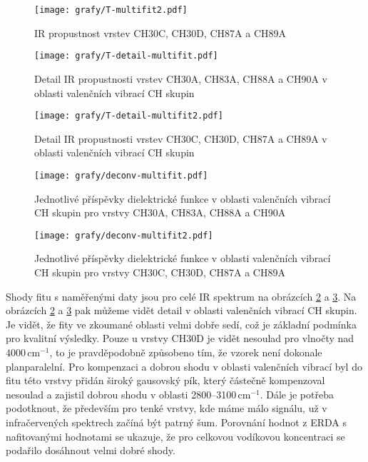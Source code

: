 \begin{figure}[htbp]
	\texttt{[image: grafy/T-multifit2.pdf]}
	\caption{IR propustnost vrstev CH30C, CH30D, CH87A a CH89A}
	\label{T-multifit2}
\end{figure}

\begin{figure}[htbp]
	\texttt{[image: grafy/T-detail-multifit.pdf]}
	\caption{Detail IR propustnosti vrstev CH30A, CH83A, CH88A a CH90A v oblasti valenčních vibrací CH skupin}
	\label{T-detail}
\end{figure}

\begin{figure}[htbp]
	\texttt{[image: grafy/T-detail-multifit2.pdf]}
	\caption{Detail IR propustnosti vrstev CH30C, CH30D, CH87A a CH89A v oblasti valenčních vibrací CH skupin}
	\label{T-detail2}
\end{figure}

\begin{figure}[htbp]
	\texttt{[image: grafy/deconv-multifit.pdf]}
	\caption{Jednotlivé příspěvky dielektrické funkce v oblasti valenčních vibrací CH skupin pro vrstvy CH30A, CH83A, CH88A a CH90A}
	\label{deconvolute}
\end{figure}

\begin{figure}[htbp]
	\texttt{[image: grafy/deconv-multifit2.pdf]}
	\caption{Jednotlivé příspěvky dielektrické funkce v oblasti valenčních vibrací CH skupin pro vrstvy CH30C, CH30D, CH87A a CH89A}
	\label{deconvolute2}
\end{figure}

Shody fitu s naměřenými daty jsou pro celé IR spektrum na obrázcích \ref{T-detail} a \ref{T-detail2}. Na obrázcích \ref{T-detail} a \ref{T-detail2} pak můžeme vidět detail v oblasti valenčních vibrací CH skupin. Je vidět, že fity ve zkoumané oblasti velmi dobře sedí, což je základní podmínka pro kvalitní výsledky. Pouze u vrstvy CH30D je vidět nesoulad pro vlnočty nad 4000\,cm$^{-1}$, to je pravděpodobně způsobeno tím, že vzorek není dokonale planparalelní. Pro kompenzaci a dobrou shodu v oblasti valenčních vibrací byl do fitu této vrstvy přidán široký gausovský pík, který částečně kompenzoval nesoulad a zajistil dobrou shodu v oblasti 2800--3100\,cm$^{-1}$. Dále je potřeba podotknout, že především pro tenké vrstvy, kde máme málo signálu, už v infračervených spektrech začíná být patrný šum.  
Porovnání hodnot z ERDA s nafitovanými hodnotami se ukazuje, že pro celkovou vodíkovou koncentraci se podařilo dosáhnout velmi dobré shody.

